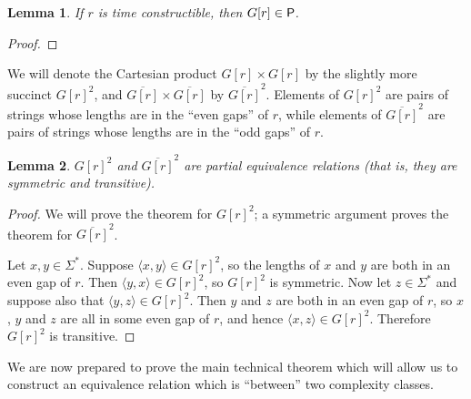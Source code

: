 \documentclass{article}
\newtheorem{lemma}[lemma]{Lemma}
\theoremstyle{definition} \newtheorem{definition}[definition]{Definition}
\newcommand{\defn}[1]{\emph{#1}} %
\newcommand{\pair}[2]{\langle#1,#2\rangle} %
\begin{document}
\begin{lemma}\label{lem:gap_p}
  If $r$ is time constructible, then $G[r]\in\P$.
\end{lemma}
\begin{proof}
\end{proof}

We will denote the Cartesian product $G[r]\times G[r]$ by the slightly more succinct ${G[r]}^2$, and $\overline{G[r]}\times\overline{G[r]}$ by $\overline{G[r]}^2$.
Elements of ${G[r]}^2$ are pairs of strings whose lengths are in the ``even gaps'' of $r$, while elements of $\overline{G[r]}^2$ are pairs of strings whose lengths are in the ``odd gaps'' of $r$.

\begin{lemma}
  ${G[r]}^2$ and $\overline{G[r]}^2$ are \defn{partial equivalence relations} (that is, they are symmetric and transitive).
\end{lemma}
\begin{proof}
  We will prove the theorem for ${G[r]}^2$; a symmetric argument proves the theorem for $\overline{G[r]}^2$.

  Let $x,y\in\Sigma^*$.
  Suppose $\pair{x}{y}\in {G[r]}^2$, so the lengths of $x$ and $y$ are both in an even gap of $r$.
  Then $\pair{y}{x}\in{G[r]}^2$, so ${G[r]}^2$ is symmetric.
  Now let $z\in\Sigma^*$ and suppose also that $\pair{y}{z}\in {G[r]}^2$.
  Then $y$ and $z$ are both in an even gap of $r$, so $x$, $y$ and $z$ are all in some even gap of $r$, and hence $\pair{x}{z}\in {G[r]}^2$.
  Therefore ${G[r]}^2$ is transitive.
\end{proof}

We are now prepared to prove the main technical theorem which will allow us to construct an equivalence relation which is ``between'' two complexity classes.
\end{document}
